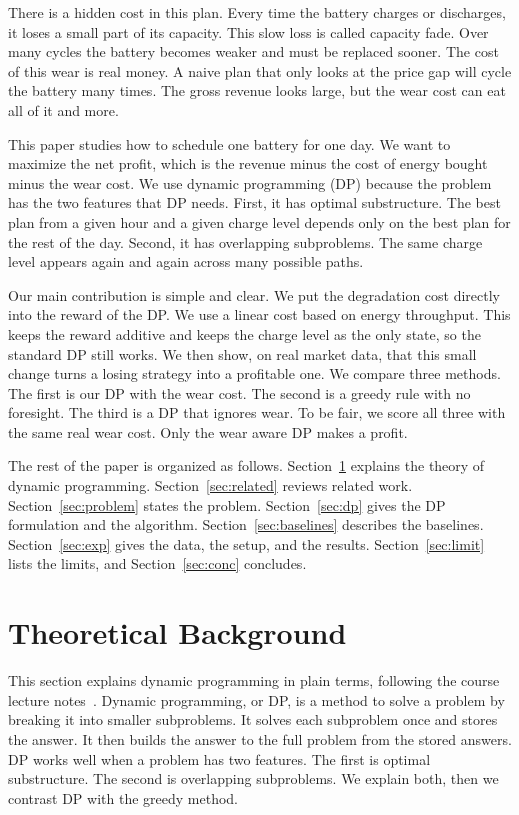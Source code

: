 \documentclass[conference,a4paper]{IEEEtran}
\begin{document}
There is a hidden cost in this plan. Every time the battery charges or
discharges, it loses a small part of its capacity. This slow loss is called
capacity fade. Over many cycles the battery becomes weaker and must be
replaced sooner. The cost of this wear is real money. A naive plan that only
looks at the price gap will cycle the battery many times. The gross revenue
looks large, but the wear cost can eat all of it and more.

This paper studies how to schedule one battery for one day. We want to
maximize the net profit, which is the revenue minus the cost of energy bought
minus the wear cost. We use dynamic programming (DP) because the problem has
the two features that DP needs. First, it has optimal substructure. The best
plan from a given hour and a given charge level depends only on the best plan
for the rest of the day. Second, it has overlapping subproblems. The same
charge level appears again and again across many possible paths.

Our main contribution is simple and clear. We put the degradation cost
directly into the reward of the DP. We use a linear cost based on energy
throughput. This keeps the reward additive and keeps the charge level as the
only state, so the standard DP still works. We then show, on real market
data, that this small change turns a losing strategy into a profitable one.
We compare three methods. The first is our DP with the wear cost. The second
is a greedy rule with no foresight. The third is a DP that ignores wear. To
be fair, we score all three with the same real wear cost. Only the wear aware
DP makes a profit.

The rest of the paper is organized as follows.
Section~\ref{sec:theory} explains the theory of dynamic programming.
Section~\ref{sec:related} reviews related work. Section~\ref{sec:problem}
states the problem. Section~\ref{sec:dp} gives the DP formulation and the
algorithm. Section~\ref{sec:baselines} describes the baselines.
Section~\ref{sec:exp} gives the data, the setup, and the results.
Section~\ref{sec:limit} lists the limits, and Section~\ref{sec:conc}
concludes.

\section{Theoretical Background}\label{sec:theory}
This section explains dynamic programming in plain terms, following the course
lecture notes~\cite{munir2026a, munir2026b}. Dynamic programming,
or DP, is a method to solve a problem by breaking it into smaller subproblems.
It solves each subproblem once and stores the answer. It then builds the answer
to the full problem from the stored answers. DP works well when a problem has
two features. The first is optimal substructure. The second is overlapping
subproblems. We explain both, then we contrast DP with the greedy method.
\end{document}
